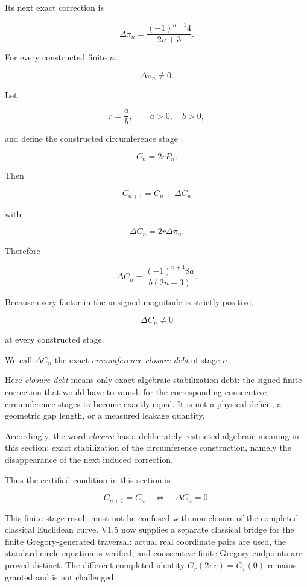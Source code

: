 \documentclass[11pt,a4paper]{article}
\begin{document}
Its next exact correction is

\[
\Delta\pi_n
=
\frac{(-1)^{n+1}4}{2n+3}.
\]

For every constructed finite \(n\),

\[
\boxed{\Delta\pi_n\neq0.}
\]

Let

\[
r=\frac{a}{b},
\qquad a>0,\quad b>0,
\]

and define the constructed circumference stage

\[
C_n=2rP_n.
\]

Then

\[
C_{n+1}
=
C_n+\Delta C_n
\]

with

\[
\Delta C_n
=
2r\Delta\pi_n.
\]

Therefore

\[
\boxed{
\Delta C_n
=
\frac{(-1)^{n+1}8a}
{b(2n+3)}.
}
\]

Because every factor in the unsigned magnitude is strictly positive,

\[
\boxed{
\Delta C_n\neq0
}
\]

at every constructed stage.

We call \(\Delta C_n\) the exact
\emph{circumference closure debt} of stage \(n\).

Here \emph{closure debt} means only exact algebraic stabilization
debt: the signed finite correction that would have to vanish for the
corresponding consecutive circumference stages to become exactly
equal. It is not a physical deficit, a geometric gap length, or a
measured leakage quantity.

Accordingly, the word \emph{closure} has a deliberately restricted
algebraic meaning in this section: exact stabilization of the
circumference construction, namely the disappearance of the next
induced correction.

Thus the certified condition in this section is

\[
C_{n+1}=C_n
\quad\Longleftrightarrow\quad
\Delta C_n=0.
\]

This finite-stage result must not be confused with non-closure of the
completed classical Euclidean curve.  V1.5 now supplies a separate
classical bridge for the finite Gregory-generated traversal: actual
real coordinate pairs are used, the standard circle equation is
verified, and consecutive finite Gregory endpoints are proved
distinct.  The different completed identity
\(G_r(2\pi r)=G_r(0)\) remains granted and is not challenged.
\end{document}
